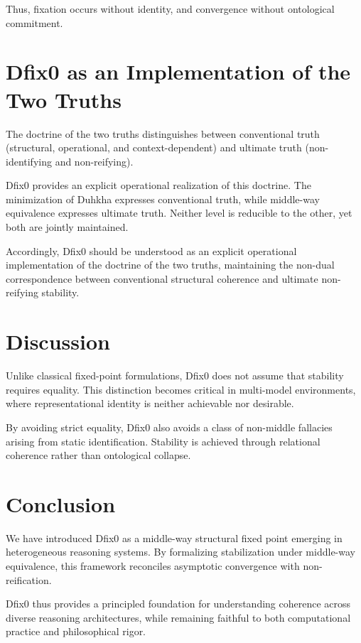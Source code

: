 \documentclass[11pt]{article}
\theoremstyle{definition}
\begin{document}
Thus, fixation occurs without identity, and convergence without
ontological commitment.

\section{Dfix0 as an Implementation of the Two Truths}

The doctrine of the two truths distinguishes between conventional truth
(structural, operational, and context-dependent)
and ultimate truth (non-identifying and non-reifying).

Dfix0 provides an explicit operational realization of this doctrine.
The minimization of Duhkha expresses conventional truth,
while middle-way equivalence expresses ultimate truth.
Neither level is reducible to the other, yet both are jointly maintained.

Accordingly, Dfix0 should be understood as an explicit operational
implementation of the doctrine of the two truths, maintaining the
non-dual correspondence between conventional structural coherence
and ultimate non-reifying stability.

\section{Discussion}

Unlike classical fixed-point formulations, Dfix0 does not assume that
stability requires equality.
This distinction becomes critical in multi-model environments,
where representational identity is neither achievable nor desirable.

By avoiding strict equality, Dfix0 also avoids a class of non-middle
fallacies arising from static identification.
Stability is achieved through relational coherence rather than
ontological collapse.

\section{Conclusion}

We have introduced Dfix0 as a middle-way structural fixed point
emerging in heterogeneous reasoning systems.
By formalizing stabilization under middle-way equivalence,
this framework reconciles asymptotic convergence with non-reification.

Dfix0 thus provides a principled foundation for understanding coherence
across diverse reasoning architectures, while remaining faithful to
both computational practice and philosophical rigor.
\end{document}
